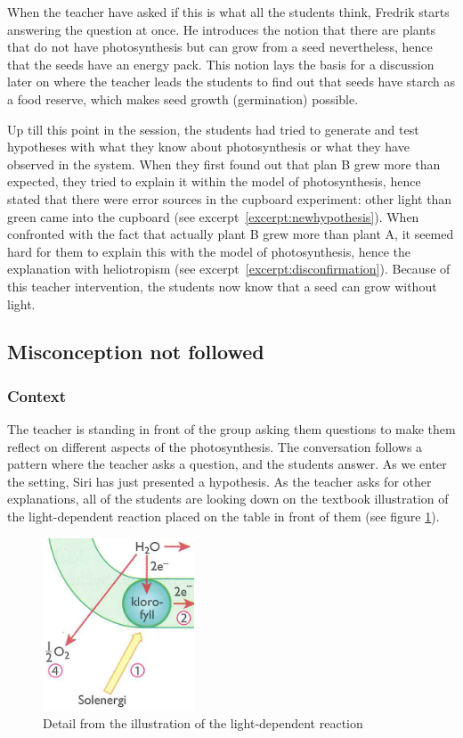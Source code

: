 When the teacher have asked if this is what all the students think, Fredrik starts answering the question at once. He introduces the notion that there are plants that do not have photosynthesis but can grow from a seed nevertheless, hence that the seeds have an energy pack. This notion lays the basis for a discussion later on where the teacher leads the students to find out that seeds have starch as a food reserve, which makes seed growth (germination) possible. 

Up till this point in the session, the students had tried to generate and test hypotheses with what they know about photosynthesis or what they have observed in the system. When they first found out that plan B grew more than expected, they tried to explain it within the model of photosynthesis, hence stated that there were error sources in the cupboard experiment: other light than green came into the cupboard (see excerpt~\ref{excerpt:newhypothesis}). When confronted with the fact that actually plant B grew more than plant A, it seemed hard for them to explain this with the model of photosynthesis, hence the explanation with heliotropism (see excerpt~\ref{excerpt:disconfirmation}). Because of this teacher intervention, the students now know that a seed can grow without light.


\subsection{Misconception not followed}

\subsubsection*{Context}
The teacher is standing in front of the group asking them questions to make them reflect on different aspects of the photosynthesis. The conversation follows a pattern where the teacher asks a question, and the students answer. As we enter the setting, Siri has just presented a hypothesis. As the teacher asks for other explanations, all of the students are looking down on the textbook illustration of the light-dependent reaction placed on the table in front of them (see figure \ref{fig:lightdependentdetail}). 

\begin{figure}
\centering
\includegraphics[width=0.4\textwidth]{img/data_analysis/light_dependent_detail.png}
\caption{Detail from the illustration of the light-dependent reaction \citep{bios}}
\label{fig:lightdependentdetail}
\end{figure}

